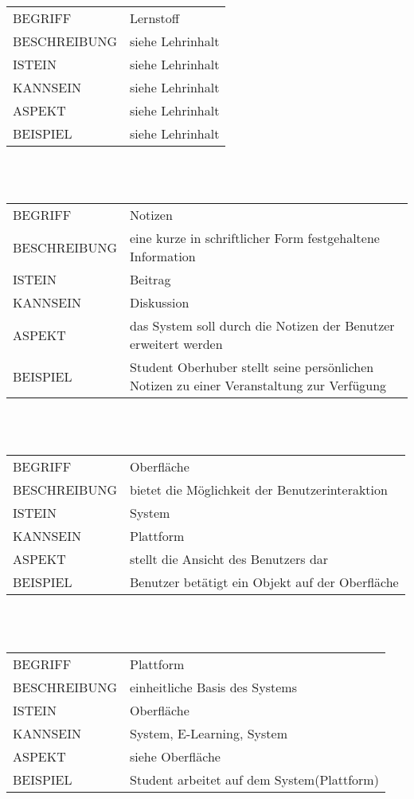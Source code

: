 \documentclass[12pt,a4paper]{article}
\begin{document}
\begin{tabular}{l p{10cm}}
BEGRIFF 	 & Lernstoff \\ 
BESCHREIBUNG & siehe Lehrinhalt\\ 
ISTEIN   	 & siehe Lehrinhalt\\
KANNSEIN 	 & siehe Lehrinhalt\\ 
ASPEKT   	 & siehe Lehrinhalt\\
BEISPIEL 	 & siehe Lehrinhalt\\
\hline
\end{tabular}\\\\ 

\begin{tabular}{l p{10cm}} 
BEGRIFF 	 & Notizen \\ 
BESCHREIBUNG & eine kurze in schriftlicher Form festgehaltene Information\\ 
ISTEIN   	 & Beitrag\\
KANNSEIN 	 & Diskussion\\ 
ASPEKT   	 & das System soll durch die Notizen der Benutzer erweitert werden\\
BEISPIEL 	 & Student Oberhuber stellt seine persönlichen Notizen zu einer Veranstaltung zur Verfügung\\
\hline
\end{tabular}\\\\  

\begin{tabular}{l p{10cm}}
BEGRIFF 	 & Oberfläche \\ 
BESCHREIBUNG & bietet die Möglichkeit der Benutzerinteraktion\\ 
ISTEIN   	 & System\\
KANNSEIN 	 & Plattform\\ 
ASPEKT   	 & stellt die Ansicht des Benutzers dar\\
BEISPIEL 	 & Benutzer betätigt ein Objekt auf der Oberfläche\\
\hline
\end{tabular}\\\\  

\begin{tabular}{l p{10cm}}
BEGRIFF 	 & Plattform \\ 
BESCHREIBUNG & einheitliche Basis des Systems\\ 
ISTEIN   	 & Oberfläche\\
KANNSEIN 	 & System, E-Learning, System \\ 
ASPEKT   	 & siehe Oberfläche\\
BEISPIEL 	 & Student arbeitet auf dem System(Plattform)\\
\hline
\end{tabular}\\\\  
\end{document}
